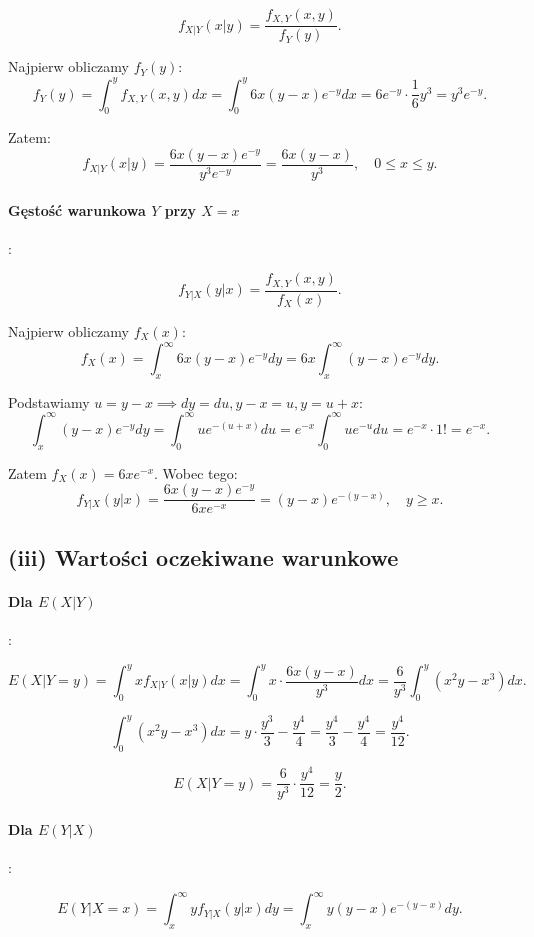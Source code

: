 \[
	f_{X|Y}(x|y) = \frac{f_{X,Y}(x,y)}{f_Y(y)}.
\]

Najpierw obliczamy \(f_Y(y)\):
\[
	f_Y(y) = \int_0^y f_{X,Y}(x,y) dx = \int_0^y 6 x (y-x) e^{-y} dx = 6 e^{-y} \cdot \frac{1}{6} y^3 = y^3 e^{-y}.
\]

Zatem:
\[
	f_{X|Y}(x|y) = \frac{6 x (y-x) e^{-y}}{y^3 e^{-y}} = \frac{6 x (y-x)}{y^3}, \quad 0 \le x \le y.
\]

\paragraph{Gęstość warunkowa \(Y\) przy \(X=x\)}:

\[
	f_{Y|X}(y|x) = \frac{f_{X,Y}(x,y)}{f_X(x)}.
\]

Najpierw obliczamy \(f_X(x)\):
\[
	f_X(x) = \int_x^\infty 6 x (y-x) e^{-y} dy = 6x \int_x^\infty (y-x) e^{-y} dy.
\]

Podstawiamy \(u = y-x \implies dy = du, y-x = u, y = u+x\):
\[
	\int_x^\infty (y-x) e^{-y} dy = \int_0^\infty u e^{-(u+x)} du = e^{-x} \int_0^\infty u e^{-u} du = e^{-x} \cdot 1! = e^{-x}.
\]

Zatem \(f_X(x) = 6 x e^{-x}\). Wobec tego:
\[
	f_{Y|X}(y|x) = \frac{6 x (y-x) e^{-y}}{6 x e^{-x}} = (y-x) e^{-(y-x)}, \quad y \ge x.
\]

\subsection*{(iii) Wartości oczekiwane warunkowe}

\paragraph{Dla \(E(X|Y)\)}:

\[
	E(X|Y=y) = \int_0^y x f_{X|Y}(x|y) dx = \int_0^y x \cdot \frac{6x(y-x)}{y^3} dx = \frac{6}{y^3} \int_0^y (x^2 y - x^3) dx.
\]

\[
	\int_0^y (x^2 y - x^3) dx = y \cdot \frac{y^3}{3} - \frac{y^4}{4} = \frac{y^4}{3} - \frac{y^4}{4} = \frac{y^4}{12}.
\]

\[
	E(X|Y=y) = \frac{6}{y^3} \cdot \frac{y^4}{12} = \frac{y}{2}.
\]

\paragraph{Dla \(E(Y|X)\)}:

\[
	E(Y|X=x) = \int_x^\infty y f_{Y|X}(y|x) dy = \int_x^\infty y (y-x) e^{-(y-x)} dy.
\]

